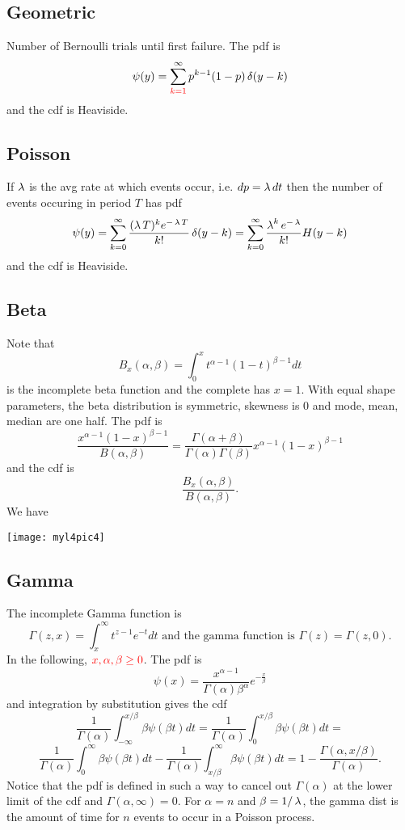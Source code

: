 \subsection{Geometric}
Number of Bernoulli trials until first failure. The pdf is $$
\psi(y) = \sum^{\infty}_{\color{red}{k=1}} p^{k-1}(1-p) \operatorname{\delta}(y-k)
$$
and the cdf is Heaviside.
\subsection{Poisson}
If $\operatorname{\lambda}$ is the avg rate at which events occur, i.e. $dp = \operatorname{\lambda} dt$ then the number of events occuring in period $T$ has pdf
$$
\psi(y) = \sum_{k=0}^\infty \frac{(\operatorname{\lambda} T)^ke^{-\operatorname{\lambda} T}}{k!}\operatorname{\delta}(y-k) = \sum_{k=0}^\infty \frac{\operatorname{\lambda}^ke^{-\operatorname{\lambda}}}{k!}H(y-k)
$$
and the cdf is Heaviside.
\subsection{Beta}
Note that
$$
B_x(\alpha,\beta) = \int_0^x t^{\alpha-1} (1-t)^{\beta-1} dt
$$
is the incomplete beta function and the complete has $x=1$.
With equal shape parameters, the beta
distribution is symmetric, skewness is 0 and mode, mean, median are one half.
The pdf is
$$
\frac{x^{\alpha-1} (1-x)^{\beta-1}}{B(\alpha,\beta)} = \frac{\Gamma(\alpha+\beta)}{\Gamma(\alpha)\Gamma(\beta)}x^{\alpha-1} (1-x)^{\beta-1}
$$
and the cdf is $$
\frac{B_x(\alpha,\beta)}{B(\alpha,\beta)}.
$$
We have
\begin{center}
\texttt{[image: myl4pic4]}
\end{center}
\subsection{Gamma}
The incomplete Gamma function is $$
\Gamma(z,x) = \int_x^\infty t^{z-1}e^{-t}dt \text{ and the gamma function is $\Gamma(z) = \Gamma(z,0).$}
$$
In the following, $\color{red}{x},\alpha,\beta \geq 0$.
The pdf is $$
\psi(x) = \frac{x^{\alpha-1}}{\Gamma(\alpha)\beta^\alpha}e^{-\frac{x}{\beta}}
$$
and integration by substitution gives  the cdf
$$
\frac{1}{\Gamma(\alpha)}\int_{-\infty}^{x \slash \beta} \beta \psi(\beta t)dt =
\frac{1}{\Gamma(\alpha)}\int_{0}^{x \slash \beta} \beta \psi(\beta t)dt =
$$
$$
\frac{1}{\Gamma(\alpha)}\int_{0}^{\infty} \beta \psi(\beta t)dt -
\frac{1}{\Gamma(\alpha)}\int_{x \slash \beta}^\infty \beta \psi(\beta t)dt =
1-\frac{\Gamma(\alpha, x \slash \beta)}{\Gamma(\alpha)}.
$$
Notice that the pdf is defined in such a way to cancel out $\Gamma(\alpha)$ at the lower limit of the cdf and $\Gamma(\alpha, \infty) = 0$.
For $\alpha = n$ and $\beta = 1 \slash \operatorname{\lambda}$, the gamma dist is the amount of time for $n$ events to occur in a Poisson process.
